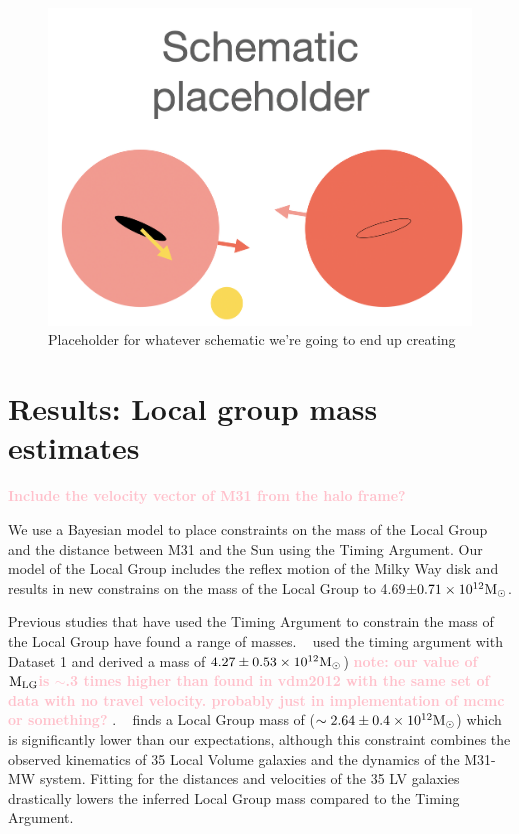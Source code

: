 \documentclass[twocolumn]{aastex631}
\newcommand{\kc}[1]{\textcolor{pink}{\textbf{#1}} }
\newcommand{\mlg}{\ensuremath{\textrm{M}_{\rm LG}}}
\begin{document}
\begin{figure}[htb]
    \centering
    \includegraphics[width=0.8\columnwidth]{schematic_placeholder.png}
    \caption{\label{fig:schematic} Placeholder for whatever schematic we're going to end up creating
    }
  \end{figure}

\section{Results: Local group mass estimates}
\label{sec:results}
\kc{Include the velocity vector of M31 from the halo frame?}


We use a Bayesian model to place constraints on the mass of the Local Group and the distance between M31 and the Sun using the Timing Argument. Our model of the Local Group includes the reflex motion of the Milky Way disk and results in new constrains on the mass of the Local Group to 4.69$\pm0.71 \times 10^{12}\mathrm{M}_\odot$.

Previous studies that have used the Timing Argument to constrain the mass of the Local Group have found a range of masses. ~\cite{vdm2012} used the timing argument with Dataset 1 and derived a mass of $4.27\pm 0.53\times 10^{12}\mathrm{M}_\odot$) \kc{note: our value of \mlg is $\sim$.3 times higher than found in vdm2012 with the same set of data with no travel velocity. probably just in implementation of mcmc or something?}.
~\cite{Penarrubia2016} finds a Local Group mass of ($\sim2.64\pm0.4\times 10^{12}\mathrm{M}_\odot$) which is significantly lower than our expectations, although this constraint combines the observed kinematics of 35 Local Volume galaxies and the dynamics of the M31-MW system. Fitting for the distances and velocities of the 35 LV galaxies drastically lowers the inferred Local Group mass compared to the Timing Argument.
\end{document}
